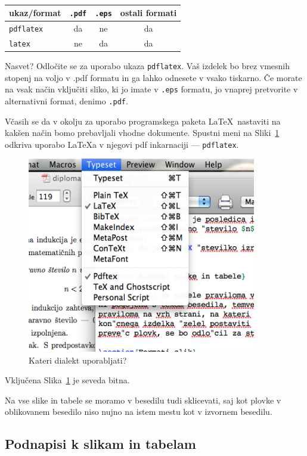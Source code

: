 \documentclass[a4paper, 12pt]{book}
\begin{document}
\begin{table}
\begin{center}
\begin{tabular}{l|ccc}
ukaz/format & {\tt .pdf} & {\tt .eps} & ostali formati \\ \hline
{\tt pdflatex} & da & ne & da \\
{\tt latex}   & ne & da  & da
\end{tabular}
\end{center}
\caption{}
\label{tbl:1}
\end{table}

Nasvet? 
Odločite se za uporabo ukaza {\tt pdflatex}. Vaš izdelek bo brez vmesnih stopenj na voljo v {.pdf} formatu in ga lahko odnesete v vsako tiskarno. 
Če morate na vsak način vključiti sliko, ki jo imate v {\tt .eps} formatu, jo vnaprej pretvorite v alternativni format, denimo {\tt .pdf}.

Včasih se da v okolju za uporabo programskega paketa \LaTeX\ nastaviti na kakšen način bomo prebavljali vhodne dokumente. 
Spustni meni na Sliki~\ref{pic2} odkriva uporabo \LaTeX{}a v njegovi pdf inkarnaciji --- {\tt pdflatex}.
\begin{figure}[t]
\begin{center}
\includegraphics[width=10cm]{pic2.png}
\end{center}
\caption{Kateri dialekt uporabljati?}
\label{pic2}
\end{figure}
Vključena Slika~\ref{pic2} je seveda bitna.

Na vse slike in tabele se moramo v besedilu tudi sklicevati, saj kot plovke v oblikovanem besedilo niso nujno na istem mestu kot v izvornem besedilu.


\subsection{Podnapisi k slikam in tabelam}
\end{document}
